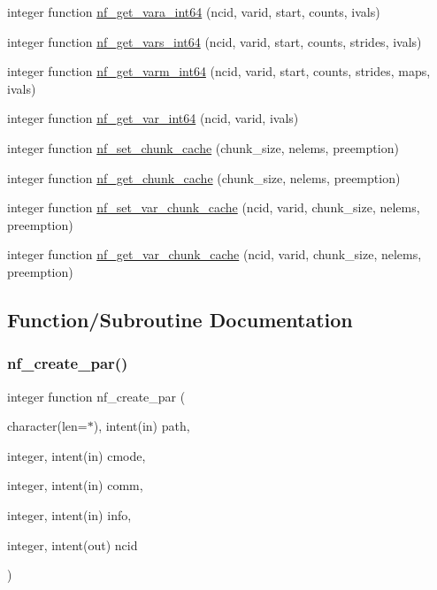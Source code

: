 \begin{DoxyCompactItemize}
\item 
integer function \hyperlink{nf__nc4_8f90_af163b0841f102fc244434763449227a8}{nf\+\_\+get\+\_\+vara\+\_\+int64} (ncid, varid, start, counts, ivals)
\item 
integer function \hyperlink{nf__nc4_8f90_a14e8b971183e4cd5884f770a766be78b}{nf\+\_\+get\+\_\+vars\+\_\+int64} (ncid, varid, start, counts, strides, ivals)
\item 
integer function \hyperlink{nf__nc4_8f90_a588f7683a728fb377fdcd27b7af6c424}{nf\+\_\+get\+\_\+varm\+\_\+int64} (ncid, varid, start, counts, strides, maps, ivals)
\item 
integer function \hyperlink{nf__nc4_8f90_aa3f48742fd7afbe9255290dfabcc6657}{nf\+\_\+get\+\_\+var\+\_\+int64} (ncid, varid, ivals)
\item 
integer function \hyperlink{nf__nc4_8f90_a9aecb7b5d039a8ba5ad9ae15d7aedce3}{nf\+\_\+set\+\_\+chunk\+\_\+cache} (chunk\+\_\+size, nelems, preemption)
\item 
integer function \hyperlink{nf__nc4_8f90_ac4731c257db212aaaef52131eea90403}{nf\+\_\+get\+\_\+chunk\+\_\+cache} (chunk\+\_\+size, nelems, preemption)
\item 
integer function \hyperlink{nf__nc4_8f90_a3eb7bc91ef81ef9a52261f647e4df754}{nf\+\_\+set\+\_\+var\+\_\+chunk\+\_\+cache} (ncid, varid, chunk\+\_\+size, nelems, preemption)
\item 
integer function \hyperlink{nf__nc4_8f90_ad6e13392d9e86ada0aea68af09e82288}{nf\+\_\+get\+\_\+var\+\_\+chunk\+\_\+cache} (ncid, varid, chunk\+\_\+size, nelems, preemption)
\end{DoxyCompactItemize}


\subsection{Function/\+Subroutine Documentation}
\mbox{\label{nf__nc4_8f90_a162dee8c95d5dce3ec0b5bbeb5624d4a}} 
\subsubsection{\texorpdfstring{nf\+\_\+create\+\_\+par()}{nf\_create\_par()}}
{\footnotesize\ttfamily integer function nf\+\_\+create\+\_\+par (\begin{DoxyParamCaption}\item[{character(len=$\ast$), intent(in)}]{path,  }\item[{integer, intent(in)}]{cmode,  }\item[{integer, intent(in)}]{comm,  }\item[{integer, intent(in)}]{info,  }\item[{integer, intent(out)}]{ncid }\end{DoxyParamCaption})}



